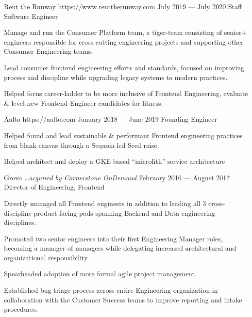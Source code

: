 \documentclass{resume}
\begin{document}
\employer
{Rent the Runway}
{https://www.renttherunway.com}
{July 2019 --- July 2020}
{Staff Software Engineer}
{
  \begin{jobitems}
  \item Manage and run the Consumer Platform team, a tiger-team consisting of senior+ engineers responsible for cross cutting engineering projects and supporting other Consumer Engineering teams.
  \item Lead consumer frontend engineering efforts and standards, focused on improving process and discipline while upgrading legacy systems to modern practices.
  \item Helped focus career-ladder to be more inclusive of Frontend Engineering, evaluate \& level new Frontend Engineer candidates for fitness.
\end{jobitems}}

\employer
{Aalto}
{https://aalto.com}
{January 2018 --- June 2019}
{Founding Engineer}
{
  \begin{jobitems}
  \item Helped found and lead sustainable \& performant Frontend engineering practices from blank canvas through a Sequoia-led Seed raise.
  \item Helped architect and deploy a GKE based ``microlith'' service architecture
\end{jobitems}}



\employer
{Grovo \emph{\ldots acquired by Cornerstone OnDemand}}
{}
{February 2016 --- August 2017}
{Director of Engineering, Frontend}
{
  \begin{jobitems}
  \item Directly managed all Frontend engineers in addition to leading all 3 cross-discipline product-facing pods spanning Backend and Data engineering disciplines.
  \item Promoted two senior engineers into their first Engineering Manager roles, becoming a manager of managers while delegating increased architectural and organizational responsibility.
  \item Spearheaded adoption of more formal agile project management.
  \item Established bug triage process across entire Engineering organization in collaboration with the Customer Success teams to improve reporting and intake procedures.
\end{jobitems}}
\end{document}
